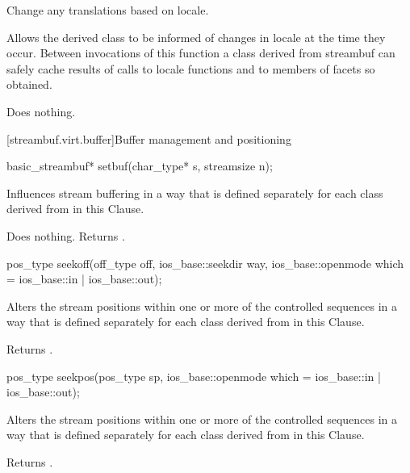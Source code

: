 \begin{itemdescr}
\pnum
\effects
Change any translations based on locale.

\pnum
\remarks
Allows the derived class to be informed of changes in locale at the
time they occur.
Between invocations of this function a class derived
from streambuf can safely cache results of calls to locale functions
and to members of facets so obtained.

\pnum
{}
Does nothing.
\end{itemdescr}

[streambuf.virt.buffer]{Buffer management and positioning}

%
\begin{itemdecl}
basic_streambuf* setbuf(char_type* s, streamsize n);
\end{itemdecl}

\begin{itemdescr}
\pnum
\effects
Influences stream buffering in a way that is defined separately for each class
derived from
in this Clause.

\pnum
{}
Does nothing.
Returns
.
\end{itemdescr}

%
\begin{itemdecl}
pos_type seekoff(off_type off, ios_base::seekdir way,
                 ios_base::openmode which
                  = ios_base::in | ios_base::out);
\end{itemdecl}

\begin{itemdescr}
\pnum
\effects
Alters the stream positions within one or more of
the controlled sequences in a way that is defined separately for each class
derived from
in this Clause.

\pnum
{}
Returns
.
\end{itemdescr}

%
\begin{itemdecl}
pos_type seekpos(pos_type sp,
                 ios_base::openmode which
                  = ios_base::in | ios_base::out);
\end{itemdecl}

\begin{itemdescr}
\pnum
\effects
Alters the stream positions within one or more of
the controlled sequences in a way that is defined separately for each class
derived from
in this Clause.

\pnum
{}
Returns
.
\end{itemdescr}

